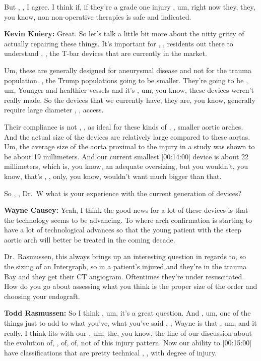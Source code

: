 \documentclass[
]{book}
\begin{document}
But , , I agree. I think if, if they're a grade one injury , um, right
now they, they, you know, non non-operative therapies is safe and
indicated.

\textbf{Kevin Kniery:} Great. So let's talk a little bit more about the nitty
gritty of actually repairing these things. It's important for , ,
residents out there to understand , , the T-bar devices that are
currently in the market.

Um, these are generally designed for aneurysmal disease and not for the
trauma population. , the Trump populations going to be smaller. They're
going to be , um, Younger and healthier vessels and it's , um, you know,
these devices weren't really made. So the devices that we currently
have, they are, you know, generally require large diameter , , access.

Their compliance is not , , as ideal for these kinds of , , smaller
aortic arches. And the actual size of the devices are relatively large
compared to these aortas. Um, the average size of the aorta proximal to
the injury in a study was shown to be about 19 millimeters. And our
current smallest {[}00:14:00{]} device is about 22 millimeters, which is,
you know, an adequate oversizing, but you wouldn't, you know, that's , ,
only, you know, wouldn't want much bigger than that.

So , , Dr.~W what is your experience with the current generation of
devices?

\textbf{Wayne Causey:} Yeah, I think the good news for a lot of these devices
is that the technology seems to be advancing. To where arch confirmation
is starting to have a lot of technological advances so that the young
patient with the steep aortic arch will better be treated in the coming
decade.

Dr.~Rasmussen, this always brings up an interesting question in regards
to, so the sizing of an Intergraph, so in a patient's injured and
they're in the trauma Bay and they get their CT angiogram. Oftentimes
they're under resuscitated. How do you go about assessing what you think
is the proper size of the order and choosing your endograft.

\textbf{Todd Rasmussen:} So I think , um, it's a great question. And , um,
one of the things just to add to what you've, what you've said , , Wayne
is that , um, and it really, I think fits with our , um, the, you know,
the line of our discussion about the evolution of, , of, of, not of this
injury pattern. Now our ability to {[}00:15:00{]} have classifications that
are pretty technical , , with degree of injury.
\end{document}
